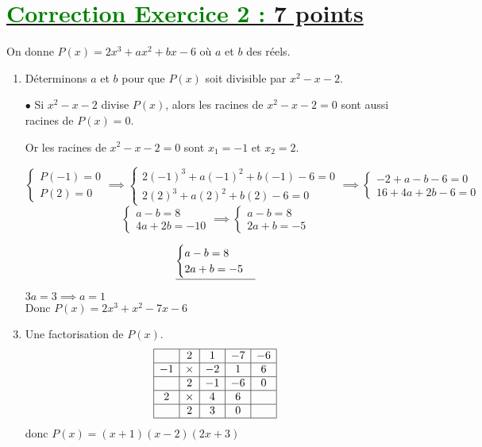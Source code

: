 \documentclass[12pt,a4paper]{article}
\begin{document}
\section*{\underline{\textcolor{green}{Correction Exercice 2 :} 7 points}}

On donne \( P(x) = 2x^3 + ax^2 + bx - 6 \) où \( a \) et \( b \) des réels.

\begin{enumerate}
    \item Déterminons \( a \) et \( b \) pour que \( P(x) \) soit divisible par \( x^2 - x - 2 \).

    \item[\( \bullet \)] Si \( x^2 - x - 2 \) divise \( P(x) \), alors les racines de \( x^2 - x - 2 = 0 \) sont aussi racines de \( P(x) = 0 \).

Or les racines de \( x^2 - x - 2 = 0 \) sont \( x_1 = -1 \) et \( x_2 = 2 \).

\[
\begin{cases}
P(-1) = 0 \\
P(2) = 0
\end{cases}\implies 
\begin{cases}
2(-1)^3 + a(-1)^2 + b(-1) - 6 = 0 \\
2(2)^3 + a(2)^2 + b(2) - 6 = 0 
\end{cases}\implies 
\begin{cases}
-2 + a - b - 6 = 0 \\
16 + 4a + 2b - 6 = 0
\end{cases}
\]
\[
\begin{cases}
a - b  = 8 \\
4a + 2b = -10
\end{cases}\implies 
\begin{cases}
a - b  = 8 \\
2a + b = -5
\end{cases}
\]

\[
\underline{
\begin{cases}
a - b  = 8 \\
2a + b = -5
\end{cases}
}\\
\]
\begin{center}
$3a=3 \implies a=1$\\
Donc \( P(x) = 2x^3 + x^2 - 7x - 6 \)
\end{center}
\item Une factorisation de \( P(x) \).
\[
\begin{array}{|c|c|c|c|c|}
\hline
 & 2 & 1 & -7 & -6  \\ 
\hline
-1 & \times & -2 & 1 & 6 \\ 
\hline
 & 2 & -1 & -6 & 0  \\
\hline
2 & \times & 4 & 6 &  \\ 
\hline
& 2 & 3 & 0 &   \\
\hline
\end{array}
\]
donc \( P(x) = (x+1)(x-2)(2x+3) \)


\end{enumerate}
\end{document}
